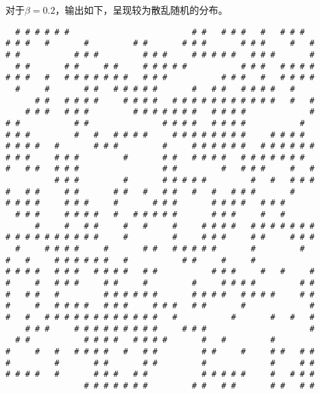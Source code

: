 \documentclass[a4paper,unicode]{report}
\begin{document}
对于$\beta=0.2$，输出如下，呈现较为散乱随机的分布。
{
\linespread{0.7}
\scriptsize
\begin{verbatim}
  # # # # # #                         # #   # # #   #   # # #
# # #   #       #         # #       # # #       # # #     #   #
# #           # # #         # # #     # # # # #   # # #       #
  # #       # #     # #     # # # # #           # # #   # # # #
# # #   #   # # # # # # #   # # #           # # #   #   # # # #
  #     #       # #   # # # # #       #   # #   # # # #   #
      # #   # # # #     # # # #   # # # # # # # # # # #   #   #
    # # #   # # #         # # # # # # #   # # # #             #
# #           # #               # # # #   # # # #           #
# # #         #   #   # # # #     # # # # # # # #     # # # #
# # # #   #       # # #         #     # # # # # #   # # # # # #
# # #     # # #         #       # #   # # # #   # # # # # # #
#   # #   # # #                 # #         #   # # #     #   #
          # # #         #       # # # # #         #   #   # # #
#   # #     # #       # #   #   # #   #   #   # # #       #
# # # #     # # #     #       # # #       # # # #   # # #
  # # #     # # # #   #   # # # # #       # # #     #   #
      #     #   # #     #   #     #     # # # #   # # # # # # #
# # # # # # # # # #     #         #     # # #     # #     # # #
  #     # # # #     #       # #   # # # # #       #         #
#   #     # # # # # #   #           # #     #     #
# # # #   # # #   # # # #   # #           # # #     #   #     #
#     #   # # #     # #     #         #     # # # #         # #
#   # #   #         # # # # # #       # # # #   # # # #     # #
#     #   # # # #   # # #     # # #   # #       #             #
#   #   # # # # # # # # # # # #   #           #       #   #   #
    # # #     # # # # # # # # #     # # #                     #
  # #           # # # #   # # # #       #   #         #
#     #   #   # # # #   #   # #         # #     #     # #   # #
#         #       # #       # #         #             #     # #
# # # #   #       # # #   # #           # # # # #     #   # # #
                # # # # # # #         # #   # #       # #   # #
\end{verbatim}
}
\end{document}
